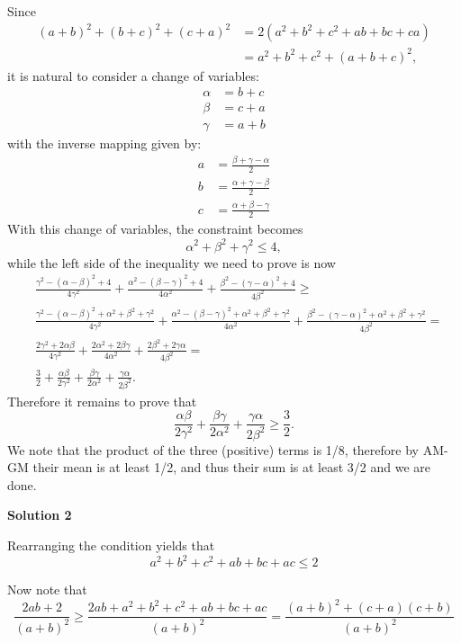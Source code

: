 \begin{enumerate}
Since
 \begin{align*} (a+b)^2 + (b+c)^2 + (c+a)^2 &= 2(a^2 + b^2 + c^2 + ab + bc + ca) \\ 	&= a^2 + b^2 + c^2 + (a + b + c)^2, \end{align*}
it is natural to consider a change of variables:
 \begin{align*} \alpha &= b + c \\ \beta &= c + a \\ \gamma &= a + b \end{align*}
with the inverse mapping given by:
 \begin{align*} a &= \frac{\beta + \gamma - \alpha}2 \\ b &= \frac{\alpha + \gamma - \beta}2 \\ c &= \frac{\alpha + \beta - \gamma}2 \end{align*}
With this change of variables, the constraint becomes
 \[\alpha^2 + \beta^2 + \gamma^2 \le 4,\]while the left side of the inequality we need to prove is now
 \begin{align*} & \frac{\gamma^2 - (\alpha - \beta)^2 + 4}{4\gamma^2} + \frac{\alpha^2 - (\beta - \gamma)^2 + 4}{4\alpha^2} + \frac{\beta^2 - (\gamma - \alpha)^2 + 4}{4\beta^2} \ge \\ & \frac{\gamma^2 - (\alpha - \beta)^2 + \alpha^2 + \beta^2 + \gamma^2}{4\gamma^2} + \frac{\alpha^2 - (\beta - \gamma)^2 + \alpha^2 + \beta^2 + \gamma^2}{4\alpha^2} + \frac{\beta^2 - (\gamma - \alpha)^2 + \alpha^2 + \beta^2 + \gamma^2}{4\beta^2} = \\ & \frac{2\gamma^2 + 2\alpha\beta}{4\gamma^2} + \frac{2\alpha^2 + 2\beta\gamma}{4\alpha^2} + \frac{2\beta^2 + 2\gamma\alpha}{4\beta^2} = \\ & \frac32 + \frac{\alpha\beta}{2\gamma^2} + \frac{\beta\gamma}{2\alpha^2} + \frac{\gamma\alpha}{2\beta^2}. \end{align*}
Therefore it remains to prove that
 \[\frac{\alpha\beta}{2\gamma^2} + \frac{\beta\gamma}{2\alpha^2} + \frac{\gamma\alpha}{2\beta^2} \ge \frac32.\]We note that the product of the three (positive) terms is 1/8, therefore by AM-GM their mean is at least 1/2, and thus their sum is at least 3/2 and we are done.

 



\textbf{Solution 2}

Rearranging the condition yields that
 \[a^2 + b^2 + c^2 +ab+bc+ac \le 2\]

 Now note that
 \[\frac{2ab+2}{(a+b)^2} \ge \frac{2ab+a^2 + b^2 + c^2 +ab+bc+ac}{(a+b)^2}=\frac{(a+b)^2 + (c+a)(c+b)}{(a+b)^2}\]


\end{enumerate}
